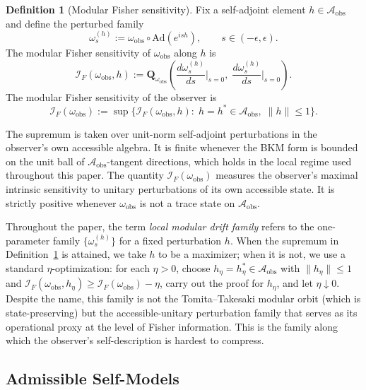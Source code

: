 \documentclass[12pt]{article}
\theoremstyle{definition}
\newtheorem{definition}[theorem]{Definition}
\theoremstyle{remark}
\begin{document}
\begin{definition}[Modular Fisher sensitivity]\label{def:2.1b}
Fix a self-adjoint element
\(h\in\mathcal{A}_{\mathrm{obs}}\) and define the perturbed family
\[
\omega_s^{(h)}
:=
\omega_{\mathrm{obs}}\circ\mathrm{Ad}(e^{ish}),
\qquad s\in(-\epsilon,\epsilon).
\]
The modular Fisher sensitivity of
\(\omega_{\mathrm{obs}}\) along \(h\) is
\[
\mathcal{I}_F(\omega_{\mathrm{obs}},h)
:=
\mathbf{Q}_{\omega_{\mathrm{obs}}}\!\left(
\frac{d\omega_s^{(h)}}{ds}\bigg|_{s=0},\;
\frac{d\omega_s^{(h)}}{ds}\bigg|_{s=0}
\right).
\]
The modular Fisher sensitivity of the observer is
\[
\mathcal{I}_F(\omega_{\mathrm{obs}})
:=
\sup\bigl\{
\mathcal{I}_F(\omega_{\mathrm{obs}},h)
:\;
h=h^*\in\mathcal{A}_{\mathrm{obs}},\;
\|h\|\le 1
\bigr\}.
\]
\end{definition}

The supremum is taken over unit-norm self-adjoint perturbations in the
observer's own accessible algebra. It is finite whenever the BKM form
is bounded on the unit ball of
\(\mathcal{A}_{\mathrm{obs}}\)-tangent directions, which holds in the
local regime used throughout this paper. The quantity
\(\mathcal{I}_F(\omega_{\mathrm{obs}})\) measures the observer's
maximal intrinsic sensitivity to unitary perturbations of its own
accessible state. It is strictly positive whenever
\(\omega_{\mathrm{obs}}\) is not a trace state on
\(\mathcal{A}_{\mathrm{obs}}\).

Throughout the paper, the term \emph{local modular drift family}
refers to the one-parameter family \(\{\omega_s^{(h)}\}\) for a fixed
perturbation \(h\). When the supremum in
Definition~\ref{def:2.1b} is attained, we take \(h\) to be a
maximizer; when it is not, we use a standard
\(\eta\)-optimization: for each \(\eta>0\), choose
\(h_\eta=h_\eta^*\in\mathcal{A}_{\mathrm{obs}}\) with
\(\|h_\eta\|\le 1\) and
\(\mathcal{I}_F(\omega_{\mathrm{obs}},h_\eta)\ge
\mathcal{I}_F(\omega_{\mathrm{obs}})-\eta\), carry out the proof for
\(h_\eta\), and let \(\eta\downarrow 0\). Despite the name, this
family is not the Tomita--Takesaki modular orbit (which is
state-preserving) but the accessible-unitary perturbation family that
serves as its operational proxy at the level of Fisher information.
This is the family along which the observer's self-description is
hardest to compress.

\subsection{Admissible Self-Models}\label{subsec:2.2}
\end{document}
